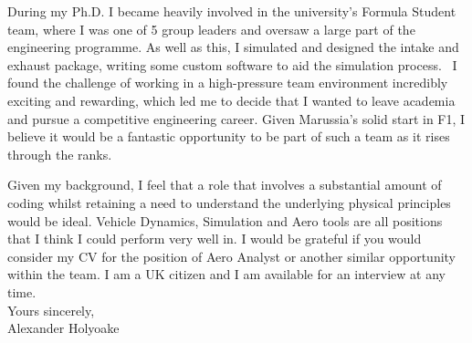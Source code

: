 \documentclass[a4paper,10pt]{article}
\begin{document}
During my Ph.D. I became heavily involved in the university's Formula Student team, where I was one of 5 group leaders and oversaw a large part of the engineering programme. As well as this, I simulated and designed the intake and exhaust package, writing some custom software to aid the simulation process.  I found the challenge of working in a high-pressure team environment incredibly exciting and rewarding, which led me to decide that I wanted to leave academia and pursue a competitive engineering career. Given Marussia’s solid start in F1, I believe it would be a fantastic opportunity to be part of such a team as it rises through the ranks.

Given my background, I feel that a role that involves a substantial amount of coding whilst retaining a need to understand the underlying physical principles would be ideal. Vehicle Dynamics, Simulation and Aero tools are all positions that I think I could perform very well in. I would be grateful if you would consider my CV for the position of Aero Analyst or another similar opportunity within the team. I am a UK citizen and I am available for an interview at any time.
\\

\noindent
Yours sincerely,\\ 

Alexander Holyoake  
\end{document}
